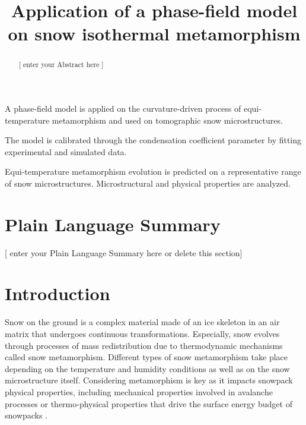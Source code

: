 \documentclass[draft,ms]{agujournal2019}
\begin{document}
\title{Application of a phase-field model on snow isothermal metamorphism}







\begin{keypoints}
\item A phase-field model is applied on the curvature-driven process of equi-temperature metamorphism and used on tomographic snow microstructures.
\item The model is calibrated through the condensation coefficient parameter by fitting experimental and simulated data.
\item Equi-temperature metamorphism evolution is predicted on a representative range of snow microstructures. Microstructural and physical properties are analyzed.
\end{keypoints}


\begin{abstract}
[ enter your Abstract here ]
\end{abstract}

\section*{Plain Language Summary}
[ enter your Plain Language Summary here or delete this section]



\section{Introduction}
\label{sec:intro}
Snow on the ground is a complex material made of an ice skeleton in an air matrix that undergoes continuous transformations. Especially, snow evolves through processes of mass redistribution due to thermodynamic mechanisms called snow metamorphism. Different types of snow metamorphism take place depending on the temperature and humidity conditions as well as on the snow microstructure itself. Considering metamorphism is key as it impacts snowpack physical properties, including mechanical properties involved in avalanche processes or thermo-physical properties that drive the surface energy budget of snowpacks \cite{vionnet_detailed_2012, lehning_physical_2002}.\\
\end{document}
